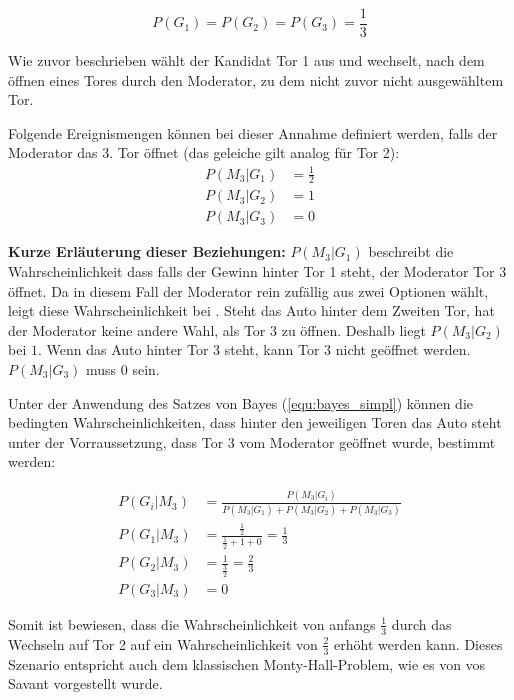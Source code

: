 \begin{equation*}
    P(G_1)=P(G_2)=P(G_3)=\frac{1}{3}
\end{equation*}

Wie zuvor beschrieben wählt der Kandidat Tor 1 aus und wechselt, nach dem öffnen eines Tores durch den Moderator, zu dem nicht zuvor nicht ausgewähltem Tor.

Folgende Ereignismengen können bei dieser Annahme definiert werden, falls der Moderator das 3. Tor öffnet (das geleiche gilt analog für Tor 2):
\begin{align*}
    P(M_3 | G_1) & = \frac{1}{2} \\
    P(M_3 | G_2) & = 1           \\
    P(M_3 | G_3) & = 0
\end{align*}

\textbf{Kurze Erläuterung dieser Beziehungen:} $P(M_3 | G_1)$ beschreibt die Wahrscheinlichkeit dass falls der Gewinn hinter Tor 1 steht, der Moderator Tor 3 öffnet. Da in diesem Fall der Moderator rein zufällig aus zwei Optionen wählt, leigt diese Wahrscheinlichkeit bei . Steht das Auto hinter dem Zweiten Tor, hat der Moderator keine andere Wahl, als Tor 3 zu öffnen. Deshalb liegt $P(M_3 | G_2)$ bei $1$. Wenn das Auto hinter Tor 3 steht, kann Tor 3 nicht geöffnet werden. $P(M_3 | G_3)$ muss $0$ sein.

Unter der Anwendung des Satzes von Bayes (\autoref{equ:bayes_simpl}) können die bedingten Wahrscheinlichkeiten, dass hinter den jeweiligen Toren das Auto steht unter der Vorraussetzung, dass Tor 3 vom Moderator geöffnet wurde, bestimmt werden:

\begin{align*}
    P(G_i | M_3) & = \frac{P(M_3 | G_i)}{P(M_3 | G_1) +
    P(M_3 | G_2) + P(M_3 | G_3)}                                       \\
    P(G_1 | M_3) & = \frac{\frac{1}{2}}{\frac{1}{2}+1+0} = \frac{1}{3} \\
    P(G_2 | M_3) & = \frac{1}{\frac{3}{2}} = \frac{2}{3}               \\
    P(G_3 | M_3) & = 0
\end{align*}

Somit ist bewiesen, dass die Wahrscheinlichkeit von anfangs $\frac{1}{3}$ durch das Wechseln auf Tor 2 auf ein Wahrscheinlichkeit von $\frac{2}{3}$ erhöht werden kann. Dieses Szenario entspricht auch dem klassischen Monty-Hall-Problem, wie es von vos Savant vorgestellt wurde.


